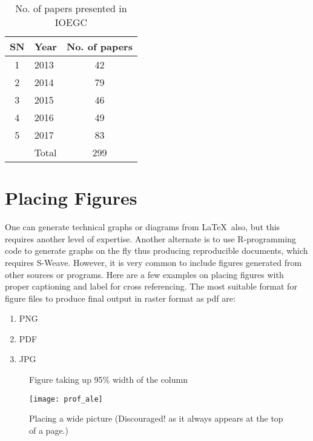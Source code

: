 \documentclass[fleqn, 10pt, twoside, blindreview]{IOEGC}
\begin{document}
\begin{table}[H]
	\caption{No. of papers presented in IOEGC}
	\label{tbl:capacity}
	\centering
	\begin{tabular}{|c|l|c|} %
		\hline
		SN & Year & No. of papers \\
		\hline
		1 & 2013 & 42	\\
		2 & 2014 & 79	\\
		3 & 2015 & 46	\\
		4 & 2016 & 49	\\
		5 & 2017 & 83 	\\
		\hline
		 & Total & 299 	\\
		\hline
	\end{tabular}
\end{table}


\section{Placing Figures} \label{sec:figures}
One can generate technical graphs or diagrams from \LaTeX\ also, but this 
requires another level of expertise. Another alternate is to use R-programming 
code to generate graphs on the fly thus producing reproducible documents, 
which requires S-Weave. However, it is very common to include figures generated 
from other sources or programs. Here are a few examples on placing figures with 
proper captioning and label for cross referencing. The most suitable format for 
figure files to produce final output in raster format as pdf are:

\begin{enumerate}[noitemsep]
	\item PNG
	\item PDF
	\item JPG
\end{enumerate}

\begin{figure}[H]\centering
	\caption{Figure taking up 95\% width of the column}
	\label{fig:graph-1}
\end{figure}

\begin{figure*}[hbt]\centering
	\texttt{[image: prof\_ale]}
	\caption{Placing a wide picture (Discouraged! as it always appears at the 
			 top of a page.)}
	\label{fig:ale-sir}
\end{figure*}
\end{document}
